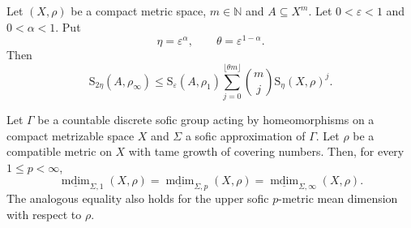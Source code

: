 \documentclass[10pt,a4paper]{amsart}
\newcommand{\mdim}{\operatorname{mdim}}
\begin{document}
\begin{lemma}\label{lem:sparse}
Let $(X,\rho)$ be a compact metric space, $m \in \mathbb{N}$ and $A\subseteq X^m$. Let  $0<\varepsilon<1$ and $0<\alpha<1$. Put
\[
 \eta=\varepsilon^\alpha,
 \qquad
 \theta=\varepsilon^{1-\alpha}.
\]
Then
\[
 \mathrm{S}_{2\eta}(A,\rho_\infty)
 \leq
 \mathrm{S}_\varepsilon(A,\rho_1)
 \sum_{j=0}^{\lfloor\theta m\rfloor}
 \binom mj \mathrm{S}_\eta(X,\rho)^j.
 \tag{3.5}
\]
\end{lemma}

\begin{proposition}\label{prop:tame-equality}
Let $\Gamma$ be a countable discrete sofic group acting by homeomorphisms on a compact metrizable
space $X$ and $\Sigma$ a sofic approximation of $\Gamma$.
Let $\rho$ be a  compatible metric on $X$ with tame growth of covering numbers. Then, for every $1\leq p<\infty$,
\[
 \underline{\mdim}_{\Sigma,1}(X,\rho)
 =\underline{\mdim}_{\Sigma,p}(X,\rho)
 =\underline{\mdim}_{\Sigma,\infty}(X,\rho).
 \tag{3.6}
\]
The analogous equality also holds for the upper sofic $p$-metric mean dimension with respect to  $\rho$.
\end{proposition}
\end{document}
